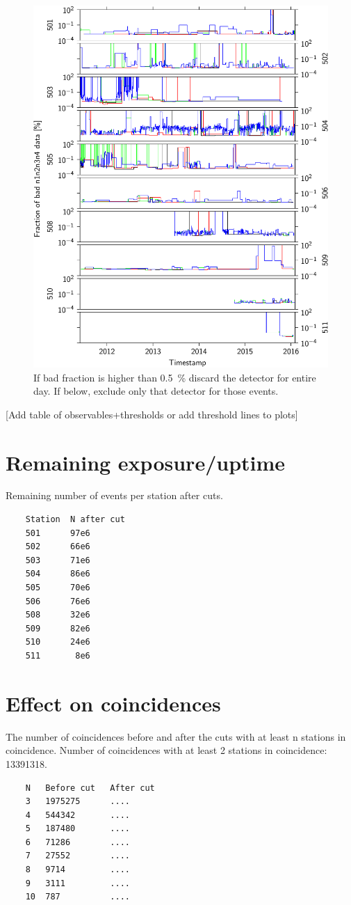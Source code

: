 \begin{figure}
    \centering
    \includegraphics[width=0.7\linewidth]{plots/dataset/bad_fraction_n1n2n3n4.pdf}
    \caption{If bad fraction is higher than \SI{.5}{\percent} discard the detector for entire day. If below, exclude only that detector for those events.}
    \label{fig:bad_n}
\end{figure}

[Add table of observables+thresholds or add threshold lines to plots]


\section{Remaining exposure/uptime}


Remaining number of events per station after cuts.

\begin{verbatim}
    Station  N after cut
    501      97e6
    502      66e6
    503      71e6
    504      86e6
    505      70e6
    506      76e6
    508      32e6
    509      82e6
    510      24e6
    511       8e6
\end{verbatim}


\section{Effect on coincidences}

The number of coincidences before and after the cuts with at least n stations in coincidence. Number of coincidences with at least 2 stations in coincidence: 13391318.

\begin{verbatim}
    N   Before cut   After cut
    3   1975275      ....
    4   544342       ....
    5   187480       ....
    6   71286        ....
    7   27552        ....
    8   9714         ....
    9   3111         ....
    10  787          ....
\end{verbatim}
